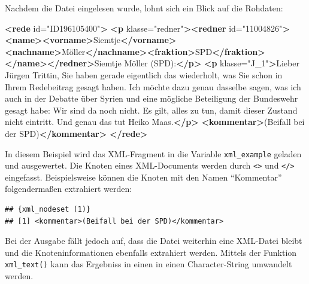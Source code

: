 \documentclass[oneside, 12pt]{scrbook}
\newenvironment{Shaded}{\begin{snugshade}}{\end{snugshade}}
\newcommand{\KeywordTok}[1]{\textcolor[rgb]{0.13,0.29,0.53}{\textbf{#1}}}
\newcommand{\NormalTok}[1]{#1}
\newcommand{\OperatorTok}[1]{\textcolor[rgb]{0.81,0.36,0.00}{\textbf{#1}}}
\newcommand{\OtherTok}[1]{\textcolor[rgb]{0.56,0.35,0.01}{#1}}
\newcommand{\StringTok}[1]{\textcolor[rgb]{0.31,0.60,0.02}{#1}}
\theoremstyle{definition}
\theoremstyle{definition}
\theoremstyle{definition}
\theoremstyle{remark}
\begin{document}
Nachdem die Datei eingelesen wurde, lohnt sich ein Blick auf die
Rohdaten:

\begin{Shaded}
\begin{Highlighting}[]
\KeywordTok{<rede}\OtherTok{ id=}\StringTok{"ID196105400"}\KeywordTok{>}
  \KeywordTok{<p}\OtherTok{ klasse=}\StringTok{"redner"}\KeywordTok{><redner}\OtherTok{ id=}\StringTok{"11004826"}\KeywordTok{><name><vorname>}\NormalTok{Siemtje}\KeywordTok{</vorname><nachname>}\NormalTok{Möller}\KeywordTok{</nachname><fraktion>}\NormalTok{SPD}\KeywordTok{</fraktion></name></redner>}\NormalTok{Siemtje Möller (SPD):}\KeywordTok{</p>}
  \KeywordTok{<p}\OtherTok{ klasse=}\StringTok{"J_1"}\KeywordTok{>}\NormalTok{Lieber Jürgen Trittin, Sie haben gerade eigentlich das wiederholt, was Sie schon in Ihrem Redebeitrag gesagt haben. Ich möchte dazu genau dasselbe sagen, was ich auch in der Debatte über Syrien und eine mögliche Beteiligung der Bundeswehr gesagt habe: Wir sind da noch nicht. Es gilt, alles zu tun, damit dieser Zustand nicht eintritt. Und genau das tut Heiko Maas.}\KeywordTok{</p>}
  \KeywordTok{<kommentar>}\NormalTok{(Beifall bei der SPD)}\KeywordTok{</kommentar>}
\KeywordTok{</rede>}
\end{Highlighting}
\end{Shaded}

In diesem Beispiel wird das XML-Fragment in die Variable
\texttt{xml\_example} geladen und ausgewertet. Die Knoten eines
XML-Documents werden durch \texttt{\textless{}\textgreater{}} und
\texttt{\textless{}/\textgreater{}} eingefasst. Beispielsweise können
die Knoten mit den Namen ``Kommentar'' folgendermaßen extrahiert werden:

\begin{Shaded}
\end{Shaded}

\begin{verbatim}
## {xml_nodeset (1)}
## [1] <kommentar>(Beifall bei der SPD)</kommentar>
\end{verbatim}

Bei der Ausgabe fällt jedoch auf, dass die Datei weiterhin eine
XML-Datei bleibt und die Knoteninformationen ebenfalls extrahiert
werden. Mittels der Funktion \texttt{xml\_text()} kann das Ergebniss in
einen in einen Character-String umwandelt werden.
\end{document}
